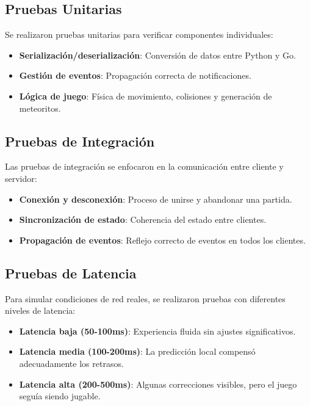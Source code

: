 \documentclass[11pt,letterpaper]{article}
\begin{document}
\subsection{Pruebas Unitarias}

Se realizaron pruebas unitarias para verificar componentes individuales:

\begin{itemize}
    \item \textbf{Serialización/deserialización}: Conversión de datos entre Python y Go.
    \item \textbf{Gestión de eventos}: Propagación correcta de notificaciones.
    \item \textbf{Lógica de juego}: Física de movimiento, colisiones y generación de meteoritos.
\end{itemize}

\subsection{Pruebas de Integración}

Las pruebas de integración se enfocaron en la comunicación entre cliente y servidor:

\begin{itemize}
    \item \textbf{Conexión y desconexión}: Proceso de unirse y abandonar una partida.
    \item \textbf{Sincronización de estado}: Coherencia del estado entre clientes.
    \item \textbf{Propagación de eventos}: Reflejo correcto de eventos en todos los clientes.
\end{itemize}

\subsection{Pruebas de Latencia}

Para simular condiciones de red reales, se realizaron pruebas con diferentes niveles de latencia:

\begin{itemize}
    \item \textbf{Latencia baja (50-100ms)}: Experiencia fluida sin ajustes significativos.
    \item \textbf{Latencia media (100-200ms)}: La predicción local compensó adecuadamente los retrasos.
    \item \textbf{Latencia alta (200-500ms)}: Algunas correcciones visibles, pero el juego seguía siendo jugable.
\end{itemize}
\end{document}
